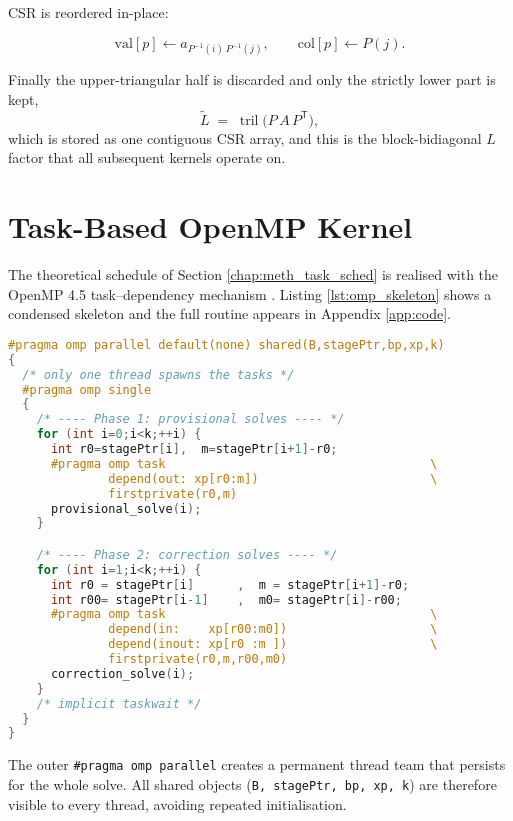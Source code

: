 CSR is reordered in-place:

$$
  \text{val}[p] \leftarrow a_{P^{-1}(i)\,P^{-1}(j)},\qquad
  \text{col}[p] \leftarrow P(j).
$$

Finally the upper-triangular half is discarded and only the strictly
lower part is kept,
$$
  \tilde L \;=\; \operatorname{tril}\!\bigl(P\,A\,P^{\mathsf T}\bigr),
$$
which is stored as one contiguous CSR array, and this is the block-bidiagonal
$L$ factor that all subsequent kernels operate on.
\section{Task-Based OpenMP Kernel}
\label{sec:impl_tasks}

The theoretical schedule of Section \ref{chap:meth_task_sched} is
realised with the OpenMP 4.5 task–dependency mechanism \cite{openmp2015programminginterface}.
Listing \ref{lst:omp_skeleton} shows a condensed skeleton and the full
routine appears in Appendix \ref{app:code}.

\begin{lstlisting}[language=C++,caption={Skeleton of the
\texttt{blockBiDiagSolveTasks} kernel.},label={lst:omp_skeleton}]
#pragma omp parallel default(none) shared(B,stagePtr,bp,xp,k)
{
  /* only one thread spawns the tasks */
  #pragma omp single
  {
    /* ---- Phase 1: provisional solves ---- */
    for (int i=0;i<k;++i) {
      int r0=stagePtr[i],  m=stagePtr[i+1]-r0;
      #pragma omp task                                     \
              depend(out: xp[r0:m])                        \
              firstprivate(r0,m)
      provisional_solve(i);
    }

    /* ---- Phase 2: correction solves ---- */
    for (int i=1;i<k;++i) {
      int r0 = stagePtr[i]      ,  m = stagePtr[i+1]-r0;
      int r00= stagePtr[i-1]    ,  m0= stagePtr[i]-r00;
      #pragma omp task                                     \
              depend(in:    xp[r00:m0])                    \
              depend(inout: xp[r0 :m ])                    \
              firstprivate(r0,m,r00,m0)
      correction_solve(i);
    }
    /* implicit taskwait */
  }
}
\end{lstlisting}

The outer \verb|#pragma omp parallel| creates a permanent thread team
that persists for the whole solve.  All shared objects
(\texttt{B, stagePtr, bp, xp, k}) are therefore visible to every
thread, avoiding repeated initialisation.

